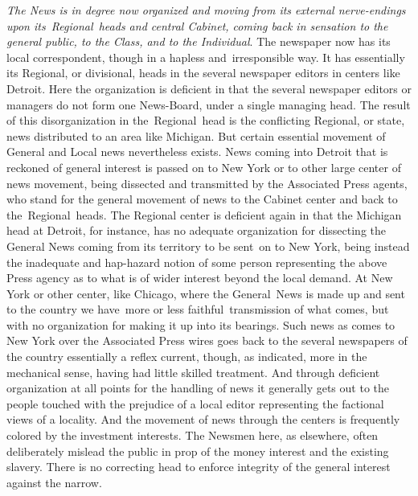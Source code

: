 \documentclass[twoside,symmetric,nobib,justified]{tufte-book}
\begin{document}
\vspace{0.05in}

\emph{The News is in degree now organized and moving from its external
nerve-endings upon its~Regional~heads and central Cabinet, coming back
in sensation to the general public, to the Class, and to the
Individual}. The newspaper now has its local correspondent, though in a
hapless and~irresponsible way. It has essentially its Regional, or
divisional, heads in the several newspaper editors in centers like
Detroit. Here the organization is deficient in that the several
newspaper editors or managers do not form one News-Board, under a single
managing head. The result of this disorganization in the~Regional~head
is the conflicting Regional, or state, news distributed to an area like
Michigan. But certain essential movement of General and Local news
nevertheless exists. News coming into Detroit that is reckoned of
general interest is passed on to New York or to other large center of
news movement, being dissected and transmitted by the Associated Press
agents, who stand for the general movement of news to the Cabinet center
and back to the~Regional~heads. The Regional center is deficient again
in that the Michigan head at Detroit, for instance, has no adequate
organization for dissecting the General News coming from its territory
to be sent~on to New York, being instead the inadequate and hap-hazard
notion of some person representing the above Press agency as to what is
of wider interest beyond the local demand. At New York or other center,
like Chicago, where the General~News is made up and sent to the country
we have~more or less faithful~transmission of what comes, but with no
organization for making it up into its bearings. Such news as comes to
New York over the Associated Press wires goes back to the several
newspapers of the country essentially a reflex current, though, as
indicated, more in the mechanical sense, having had little skilled
treatment. And through deficient organization at all points for the
handling of news it generally gets out to the people touched with the
prejudice of a local editor representing the factional views of a
locality. And the movement of news through the centers is frequently
colored by the investment interests. The Newsmen here, as elsewhere,
often deliberately mislead the public in prop of the money interest and
the existing slavery. There is no correcting head to enforce integrity
of the general interest against the narrow.~~
\end{document}

